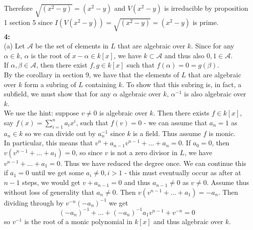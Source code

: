 \documentclass[a4paper]{article}
\begin{document}
      Therefore $\sqrt{\left( x^2 -y \right) } = (x^2 - y)$ and
      $V(x^2 - y)$ is irreducible by proposition 1 section 5 since
      $I\left( V\left( x^2 - y \right)  \right) = \sqrt{\left( x^2 - y \right) } 
      = \left( x^2 - y \right) $ is prime.\\
      \linebreak
      \textbf{4:} \\
      (a) Let $\mathcal{A}$ be the set of elements in $L$ that are algebraic
      over $k$. Since for any $\alpha \in k$, $\alpha$ is the root of
      $x- \alpha \in k\left[ x \right] $, we have $k \subset \mathcal{A}$ and
      thus also $0,1 \in \mathcal{A}$.\\
      If $\alpha, \beta \in \mathcal{A}$, then there exist
      $f,g \in k[x]$ such that $f(\alpha) = 0 = g(\beta)$.\\
      By the corollary in section 9, we have that
      the elements of $L$ that are algebraic over $k$ form a subring
      of $L$ containing $k$. To show that this subring is, in fact, a subfield,
      we must show that for any $\alpha$ algebraic over $k$, $\alpha^{-1}$ is
      also algebraic over $k$.\\
      \linebreak
      We use the hint: suppose $v \neq 0$ is algebraic over $k$. Then there
      exists $f \in k\left[ x \right] $, say $f(x) = \sum_{i=1}^{n} a_i x^{i}$,
      such that $f(v) = 0$ - we can assume that
      $a_n = 1$ as $a_n \in k$ so we can divide out by $a_n^{-1}$ since $k$ is
      a field. Thus assume $f$ is monic.\\
      In particular, this means that
      $v^{n} + a_{n-1} v^{n-1} + \ldots + a_n = 0$. If $a_0 = 0$, then
      $v \left( v^{n-1} + \ldots + a_1 \right) = 0 $, so since $v$ is not
      a zero divisor in $L$, we have $v^{n-1} + \ldots + a_1 = 0$. Thus we have
      reduced the degree once. We can continue this if $a_1 = 0$ until we get
      some $a_i \neq 0, i>1$ - this must eventually occur as after at $n-1$ 
      steps, we would get $v + a_{n-1} = 0$ and thus $a_{n-1} \neq 0$ as $v\neq
      0$. Assume thus without loss of generality that
      $a_n \neq 0$. Then $v \left( v^{n-1} + \ldots + a_1 \right) = -a_n$. Then
      dividing through by $v^{-n}(-a_n)^{-1}$ we get
      \[
          (-a_n)^{-1} + \ldots + (-a_n)^{-1}a_1 v^{n-1} + v^{-n} = 0
      \]
      so $v^{-1}$ is the root of a monic polynomial in  $k[x]$ and thus
      algebraic over $k$.\\
      \linebreak
\end{document}
